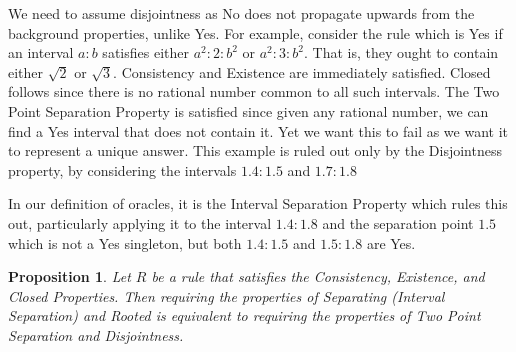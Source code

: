 \documentclass[12pt]{article}
\newtheorem{proposition}{Proposition}[subsection]
\begin{document}
We need to assume disjointness as No does not propagate upwards from the background properties, unlike Yes. For example, consider the rule which is Yes if an interval $a:b$ satisfies either $a^2:2:b^2$ or $a^2:3:b^2$. That is, they ought to contain either $\sqrt{2}$ or $\sqrt{3}$. Consistency and Existence are immediately satisfied. Closed follows since there is no rational number common to all such intervals. The Two Point Separation Property is satisfied since given any rational number, we can find a Yes interval that does not contain it. Yet we want this to fail as we want it to represent a unique answer. This example is ruled out only by the Disjointness property, by considering the intervals $1.4:1.5$ and $1.7:1.8$

In our definition of oracles, it is the Interval Separation Property which rules this out, particularly applying it to the interval $1.4:1.8$ and the separation point $1.5$ which is not a Yes singleton, but both $1.4:1.5$ and $1.5:1.8$ are Yes. 

\begin{proposition}
    Let $R$ be a rule that satisfies the Consistency, Existence, and Closed Properties. Then requiring the properties of Separating (Interval Separation) and Rooted is equivalent to requiring the properties of Two Point Separation and Disjointness. 
\end{proposition}
\end{document}
